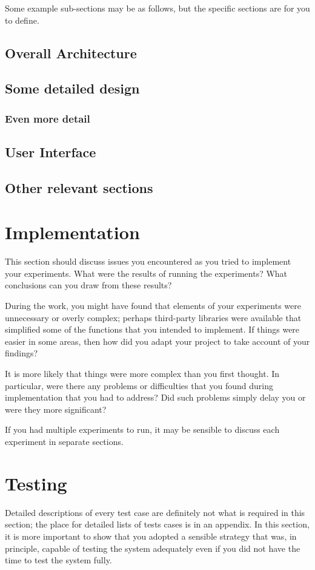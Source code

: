 Some example sub-sections may be as follows, but the specific sections are for you to define. 

\subsection{Overall Architecture}

\subsection{Some detailed design}

\subsubsection{Even more detail}

\subsection{User Interface}

\subsection{Other relevant sections}

\section{Implementation}

This section should discuss issues you encountered as you tried to implement your experiments. What were the results of running the experiments? What conclusions can you draw from these results? 

During the work, you might have found that elements of your experiments were unnecessary or overly complex; perhaps third-party libraries were available that simplified some of the functions that you intended to implement. If things were easier in some areas, then how did you adapt your project to take account of your findings?

It is more likely that things were more complex than you first thought. In particular, were there any problems or difficulties that you found during implementation that you had to address? Did such problems simply delay you or were they more significant? 

If you had multiple experiments to run, it may be sensible to discuss each experiment in separate sections. 

\section{Testing}
Detailed descriptions of every test case are definitely not what is required in this section; the place for detailed lists of tests cases is in an appendix. In this section, it is more important to show that you adopted a sensible strategy that was, in principle, capable of testing the system adequately even if you did not have the time to test the system fully. 

